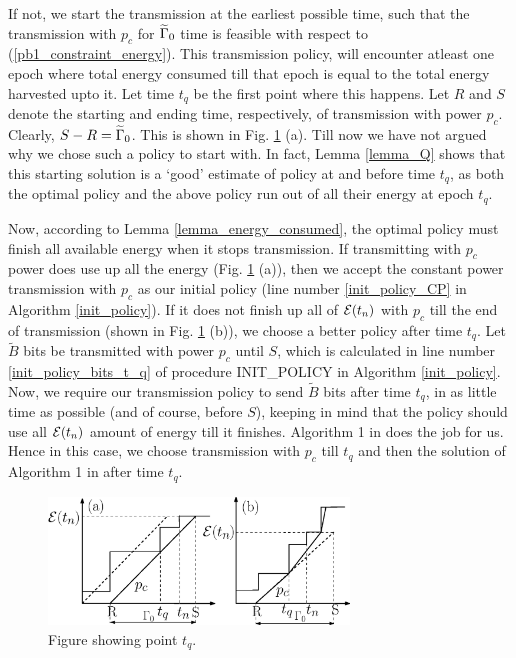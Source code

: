 If not, we start the transmission at the earliest possible time, such that the transmission with $p_c$ for $\widetilde{\Gamma}_0$ time is feasible with respect to (\ref{pb1_constraint_energy}). This transmission policy, will encounter atleast one epoch where total energy consumed till that epoch is equal to the total energy harvested upto it. Let time $t_q$ be the first point where this happens. Let $R$ and $S$ denote the starting and ending time, respectively, of transmission with power $p_c$. Clearly, $S-R=\widetilde{\Gamma}_0$. This is shown in Fig. \ref{straight} (a).  Till now we have not argued why we chose such a policy to start with. In fact, Lemma \ref{lemma_Q} shows that this starting solution is a `good' estimate of policy at and before time $t_q$, as both the optimal policy and the above policy run out of all their energy at epoch $t_q$. 

Now, according to Lemma \ref{lemma_energy_consumed}, the optimal policy must finish all available energy when it stops transmission. If transmitting with $p_c$ power does use up all the energy (Fig. \ref{straight} (a)), then we accept the constant power transmission with $p_c$ as our initial policy (line number \ref{init_policy_CP} in Algorithm \ref{init_policy}). If it does not finish up all of $\mathcal{E}(t_n)$ with $p_c$ till the end of transmission (shown in Fig. \ref{straight} (b)), we choose a better policy after time $t_q$. Let $\widetilde{B}$ bits be transmitted with power $p_c$ until $S$, which is calculated in line number \ref{init_policy_bits_t_q} of procedure INIT\_POLICY in Algorithm \ref{init_policy}. Now, we require our transmission policy to send $\widetilde{B}$ bits after time $t_q$, in as little time as possible (and of course, before $S$), keeping in mind that the policy should use all $\mathcal{E}(t_n)$ amount of energy till it finishes. Algorithm 1 in \cite{Yang} does the job for us. Hence in this case, we choose transmission with $p_c$ till $t_q$ and then the solution of Algorithm 1 in \cite{Yang} after time $t_q$. 

\begin{figure}
\centering
  \centerline{\includegraphics[width=8cm]{straight.eps}}
\caption{Figure showing point $t_q$.}\label{straight}
\end{figure}

